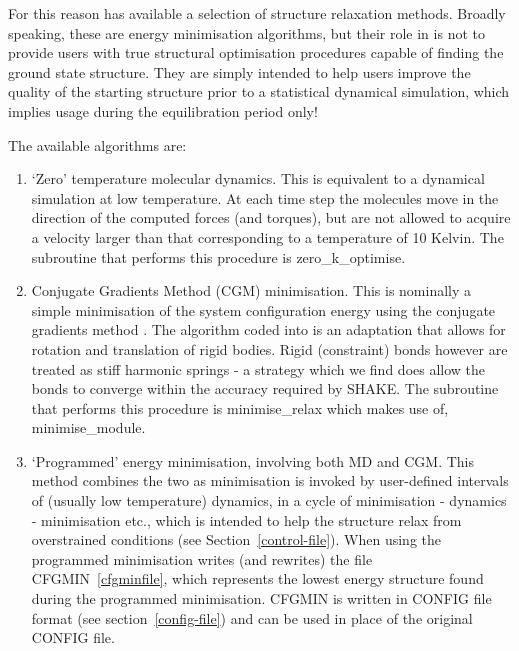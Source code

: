 For this reason \D has available a selection of structure relaxation
methods.  Broadly speaking, these are energy minimisation algorithms,
but their role in \D is not to provide users with true structural
optimisation procedures capable of finding the ground state structure.
They are simply intended to help users improve the quality of the
starting structure prior to a statistical dynamical simulation, which
implies usage during the equilibration period only!

The available algorithms are:
\begin{enumerate}
\item `Zero' temperature molecular dynamics.
This is equivalent to a dynamical simulation at low temperature.
At each time step the molecules move in the direction of the
computed forces (and torques), but are not allowed to acquire
a velocity larger than that corresponding to a temperature of 10 Kelvin.
The subroutine that performs this procedure is {\sc zero\_k\_optimise}.

\item Conjugate Gradients Method (CGM) minimisation.
This is nominally a simple minimisation of the system configuration
energy using the conjugate gradients method \cite{shewchuk-94a}.
The algorithm coded into \D is an adaptation that allows for
rotation and translation of rigid bodies. Rigid (constraint) bonds
however are treated as stiff harmonic springs - a strategy which
we find does allow the bonds to converge within the accuracy
required by SHAKE.  The subroutine that performs this procedure
is {\sc minimise\_relax} which makes use of, {\sc minimise\_module}.

\item `Programmed' energy minimisation, involving both MD and CGM.
This method combines the two as minimisation is invoked by
user-defined intervals of (usually low temperature) dynamics, in a
cycle of minimisation - dynamics - minimisation etc., which is
intended to help the structure relax from overstrained conditions
(see Section~\ref{control-file}).  When using the programmed
minimisation \D writes (and rewrites) the file CFGMIN~\ref{cfgminfile},
which represents the lowest energy structure found during the
programmed minimisation.  CFGMIN is written in CONFIG file format
(see section~\ref{config-file}) and can be used in place of the
original CONFIG file.
\end{enumerate}

